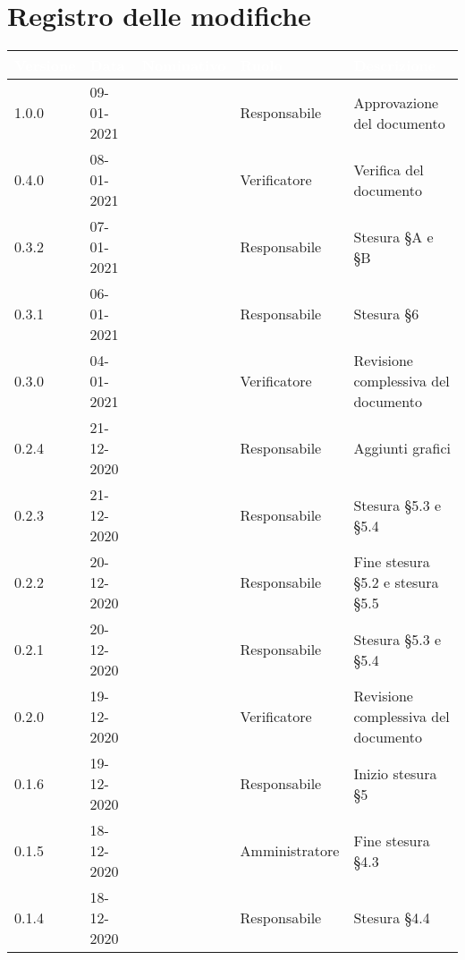 \section*{Registro delle modifiche}
{
\setcounter{table}{-1}
{
\renewcommand{\arraystretch}{1.5}
\centering
\begin{longtable}{C{1.7cm} C{2.5cm} C{3.2cm} C{2.7cm} C{4.8cm}}
\textcolor{white}{\textbf{Versione}}&
\textcolor{white}{\textbf{Data}}&
\textcolor{white}{\textbf{Nominativo}}&
\textcolor{white}{\textbf{Ruolo}}&
\textcolor{white}{\textbf{Descrizione}}\\	
\endhead

1.0.0 & 09-01-2021 & \SG{} & Responsabile & Approvazione del documento \\

0.4.0 & 08-01-2021 & \ZM{} & Verificatore & Verifica del documento \\

0.3.2 & 07-01-2021 & \BM{} & Responsabile & Stesura \S A e \S B \\

0.3.1 & 06-01-2021 & \BM{} & Responsabile & Stesura \S 6\\

0.3.0 & 04-01-2021 & \SH{} & Verificatore & Revisione complessiva del documento \\

0.2.4 & 21-12-2020 & \SG{} & Responsabile & Aggiunti grafici \\

0.2.3 & 21-12-2020 & \BM{} & Responsabile & Stesura \S 5.3 e \S 5.4\\

0.2.2 & 20-12-2020 & \SG{} & Responsabile & Fine stesura \S 5.2 e stesura \S 5.5 \\

0.2.1 & 20-12-2020 & \BM{} & Responsabile & Stesura \S 5.3 e \S 5.4\\

0.2.0 & 19-12-2020 & \ZM{} & Verificatore & Revisione complessiva del documento \\

0.1.6 & 19-12-2020 & \SG{} & Responsabile & Inizio stesura \S 5 \\

0.1.5 & 18-12-2020 & \PA{} & Amministratore & Fine stesura \S 4.3\\

0.1.4 & 18-12-2020 & \SG{} & Responsabile & Stesura \S 4.4 \\


\end{longtable}}}
